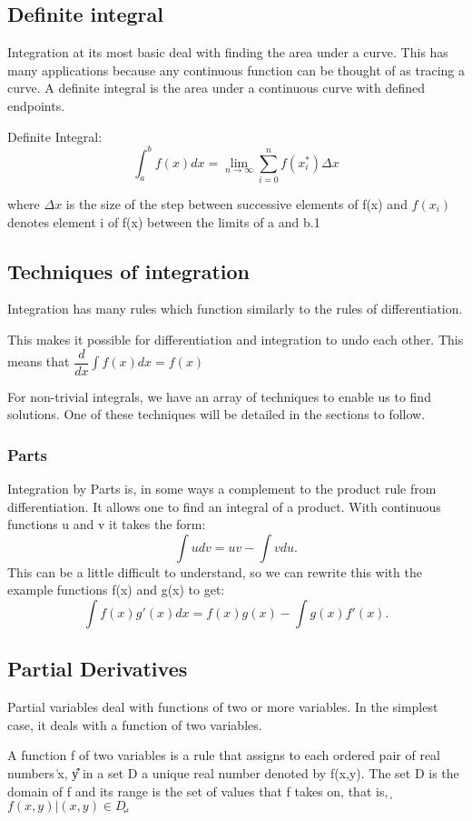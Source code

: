 \subsection{Definite integral}
Integration at its most basic deal with finding the area under a curve. This has many applications because any continuous function can be thought of as tracing a curve. A definite integral is the area under a continuous curve with defined endpoints.

\begin{theorem}
Definite Integral:
$$\int_a^b f(x)dx = \lim_{n \to \infty} \sum_{i=0}^{n}f(x_i^*)\Delta x $$

where  $\Delta x$ is the size of the step between successive elements of f(x)
and $f(x_i)$ denotes element i of f(x) between the limits of a and b.1

\end{theorem}


\subsection{Techniques of integration}
Integration has many rules which function similarly to the rules of differentiation.

This makes it possible for differentiation and integration to undo each other. This means that $\dfrac{d}{dx} \int f(x)dx = f(x)$

For non-trivial integrals, we have an array of techniques to enable us to find solutions. One of these techniques will be detailed in the sections to follow.

\subsubsection{Parts}
Integration by Parts is, in some ways a complement to the product rule from differentiation.
It allows one to find an integral of a product. With continuous functions u and v it takes the form:
$$ \int udv = uv - \int vdu.$$
This can be a little difficult to understand, so we can rewrite this with the example functions f(x) and g(x) to get:
$$ \int f(x)g'(x) dx = f(x)g(x) - \int g(x)f'(x).$$ 

\subsection{Partial Derivatives}
Partial variables deal with functions of two or more variables. In the simplest case, it deals with a function of two variables.
\begin{definition}
A function f of two variables is a rule that assigns to each ordered
pair of real numbers ͑x, y͒ in a set D a unique real number denoted by f(x,y). The
set D is the domain of f and its range is the set of values that f takes on, that is,
͕ $f{(x,y) | (x,y) \in D͖}.$
\end{definition}

